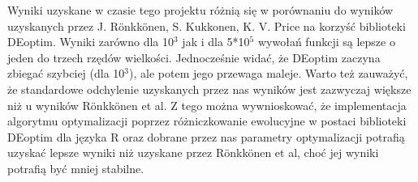 \documentclass[11pt]{article}
\begin{document}
Wyniki uzyskane w czasie tego projektu różnią się w porównaniu do
wyników uzyskanych przez J. Rönkkönen, S. Kukkonen, K. V. Price na
korzyść biblioteki DEoptim. Wyniki zarówno dla 10$^3$ jak i dla 5*10$^5$
wywołań funkcji są lepsze o jeden do trzech rzędów
wielkości. Jednocześnie widać, że DEoptim zaczyna zbiegać szybciej
(dla 10$^3$), ale potem jego przewaga maleje.
Warto też zauważyć, że standardowe odchylenie uzyskanych
przez nas wyników jest zazwyczaj większe niż u wyników Rönkkönen et
al. Z tego można wywnioskować, że implementacja algorytmu
optymalizacji poprzez różniczkowanie ewolucyjne w postaci biblioteki
DEoptim dla języka R oraz dobrane przez nas parametry optymalizacji
potrafią uzyskać lepsze wyniki niż uzyskane przez Rönkkönen et al,
choć jej wyniki potrafią być mniej stabilne.
\end{document}
